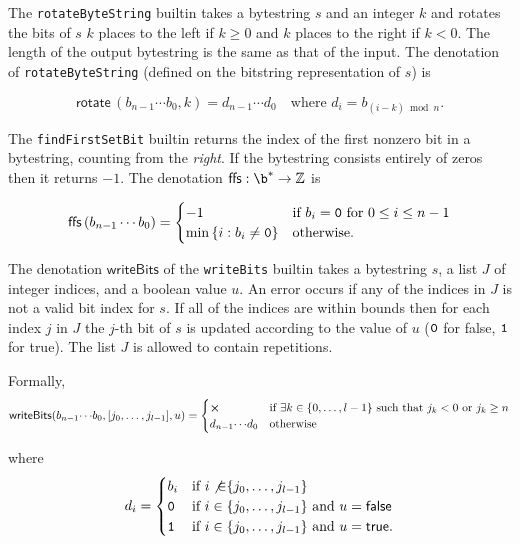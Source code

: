 \label{note:rotate}
The \texttt{rotateByteString} builtin takes a bytestring $s$ and an integer $k$
and rotates the bits of $s$ $k$ places to the left if $k \geq 0$ and $k$ places
to the right if $k < 0$.  The length of the output bytestring is the same as
that of the input.  The denotation of
\texttt{rotateByteString} (defined on the bitstring representation of $s$) is

$$
\mathsf{rotate}\,(b_{n-1} \cdots b_0, k) = d_{n-1}\cdots d_0 \quad\text{where $d_i = b_{(i-k)\bmod n}$}.
$$

\label{note:ffs}
The \texttt{findFirstSetBit} builtin returns the index of the first nonzero bit
in a bytestring, counting from the \textit{right}. If the bytestring consists
entirely of zeros then it returns $-1$.  The denotation
$\mathsf{ffs}: \b^* \rightarrow \Z$ is

$$
\mathsf{ffs}\,(b_{n-1}\cdots b_0) =
\begin{cases}
  -1 & \text{if $b_i = \mathtt{0}$ for $0 \leq i \leq n-1$}\\
  \min{\{i: b_i \ne \mathtt{0}\}} & \text{otherwise.}
  \end{cases}
$$


\label{note:writebits}
The denotation $\mathsf{writeBits}$ of the \texttt{writeBits} builtin takes a
bytestring $s$, a list $J$ of integer indices, and a boolean value $u$.  An
error occurs if any of the indices in $J$ is not a valid bit index for $s$.  If
all of the indices are within bounds then for each index $j$ in $J$ the $j$-th
bit of $s$ is updated according to the value of $u$ ($\mathtt{0}$
for \textsf{false}, $\mathtt{1}$ for \textsf{true}).  The list $J$ is allowed to
contain repetitions.

\smallskip
\noindent Formally,
$$
\mathsf{writeBits}(b_{n-1}{\cdots}b_0, [j_0, \ldots, j_{l-1}], u) =
\begin{cases}
\errorX & \text{if $\exists k \in \{0, \ldots, l-1\}$ such that $j_k < 0$ or $j_k \geq n$} \\
d_{n-1}{\cdots}d_0 & \text{otherwise}
\end{cases}
$$

\noindent where
$$
  d_i =
  \begin{cases}
    b_i & \text{if $i \not{\in} \{j_0, \ldots, j_{l-1}\}$}\\
      \mathtt{0} & \text{if $i \in \{j_0, \ldots, j_{l-1}\}$ and $u = \mathsf{false}$}\\
      \mathtt{1} & \text{if $i \in \{j_0, \ldots, j_{l-1}\}$ and $u = \mathsf{true}$}.
  \end{cases}
$$


